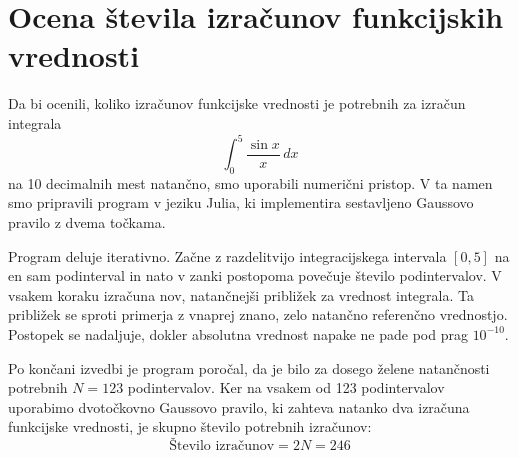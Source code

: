 \documentclass{article}
\begin{document}
\section{Ocena števila izračunov funkcijskih vrednosti}

Da bi ocenili, koliko izračunov funkcijske vrednosti je 
potrebnih za izračun integrala
\[ \int_{0}^{5} \frac{\sin x}{x} \,dx \]
na 10 decimalnih mest natančno, smo uporabili numerični pristop. 
V ta namen smo pripravili program v jeziku Julia, ki implementira 
sestavljeno Gaussovo pravilo z dvema točkama.

Program deluje iterativno. Začne z razdelitvijo integracijskega 
intervala $[0, 5]$ na en sam podinterval in nato v zanki postopoma 
povečuje število podintervalov. V vsakem koraku izračuna nov, natančnejši 
približek za vrednost integrala. Ta približek se sproti primerja z vnaprej 
znano, zelo natančno referenčno vrednostjo. Postopek se nadaljuje, dokler 
absolutna vrednost napake ne pade pod prag $10^{-10}$.

Po končani izvedbi je program poročal, da je bilo za dosego želene
natančnosti potrebnih $N = 123$ podintervalov. Ker na vsakem od 123 
podintervalov uporabimo dvotočkovno Gaussovo pravilo, ki zahteva natanko 
dva izračuna funkcijske vrednosti, je skupno število potrebnih izračunov:
\[
\text{Število izračunov} = 2N = 246
\]
\end{document}
